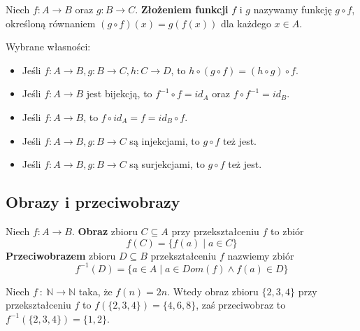 Niech $f : A \to B$ oraz $g : B \to C$. \textbf{Złożeniem funkcji} $f$ i $g$ nazywamy funkcję $g \circ f$, określoną równaniem $(g \circ f)(x) = g(f(x))$ dla każdego $x \in A$.

Wybrane własności:
\begin{itemize}
    \item Jeśli $f : A \to B, g : B \to C, h : C \to D$, to $h \circ (g \circ f) = (h \circ g) \circ f$.
    \item Jeśli $f : A \to B$ jest bijekcją, to $f^{-1} \circ f = id_A$ oraz $f \circ f^{-1} = id_B$.
    \item Jeśli $f : A \to B$, to $f \circ id_A = f = id_B \circ f$.
    \item Jeśli $f : A \to B, g : B \to C$ są injekcjami, to $g \circ f$ też jest.
    \item Jeśli $f : A \to B, g : B \to C$ są surjekcjami, to $g \circ f$ też jest.
\end{itemize}

\subsection{Obrazy i przeciwobrazy}

Niech $f : A \to B$. \textbf{Obraz} zbioru $C \subseteq A$ przy przekształceniu $f$ to zbiór
$$f(C) = \{ f(a) \; | \; a \in C \}$$
\textbf{Przeciwobrazem} zbioru $D \subseteq B$ przekształceniu $f$ nazwiemy zbiór
$$f^{-1}(D) = \{ a \in A \; | \; a \in Dom(f) \land f(a) \in D \}$$

\begin{example}
    Niech $f \ : \ \mathbb{N} \to \mathbb{N}$ taka, że $f(n) = 2n$. Wtedy obraz zbioru $\{ 2, 3, 4 \}$ przy przekształceniu $f$ to $f(\{ 2, 3, 4 \}) = \{ 4, 6, 8 \}$, zaś przeciwobraz to $f^{-1}(\{ 2, 3, 4 \}) = \{ 1, 2 \}$.
\end{example}

